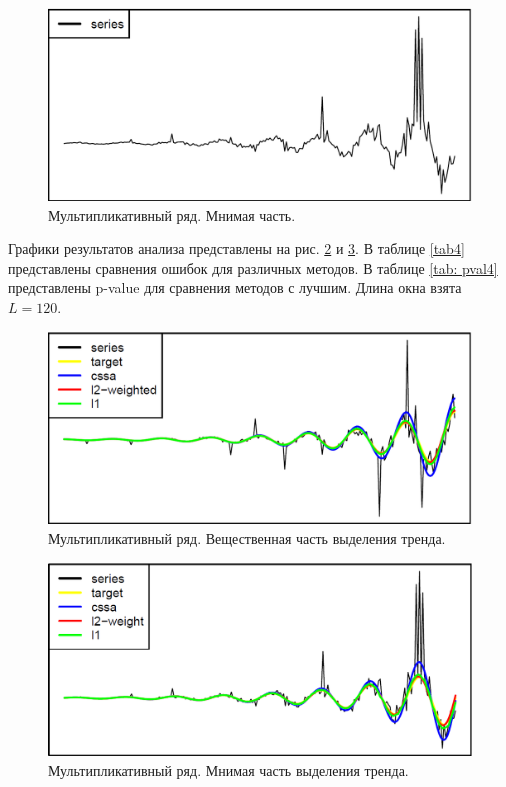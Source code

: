 \documentclass[specialist,
               substylefile = spbu.rtx,
               subf,href,colorlinks=true, 12pt]{disser}
\begin{document}
\begin{figure}[H]
	\begin{center}
		\includegraphics[width=0.67\linewidth]{img/ser_2_Im.png}
		\caption{Мультипликативный ряд. Мнимая часть.}
		\label{ser_Im_2}
	\end{center}
\end{figure}

Графики результатов анализа представлены на рис. \ref{analys_Re_2} и \ref{analys_Im_2}. В таблице \ref{tab4} представлены сравнения ошибок для различных методов. В таблице \ref{tab: pval4} представлены p-value для сравнения методов с лучшим. Длина окна взята $L = 120$.

\begin{figure}[H]
	\begin{center}
		\includegraphics[width=0.67\linewidth]{img/analys_2_Re.png}
		\caption{Мультипликативный ряд. Вещественная часть выделения тренда.}
		\label{analys_Re_2}
	\end{center}
\end{figure}

\begin{figure}[H]
	\begin{center}
		\includegraphics[width=0.67\linewidth]{img/analys_2_Im.png}
		\caption{Мультипликативный ряд. Мнимая часть выделения тренда.}
		\label{analys_Im_2}
	\end{center}
\end{figure}
\end{document}
